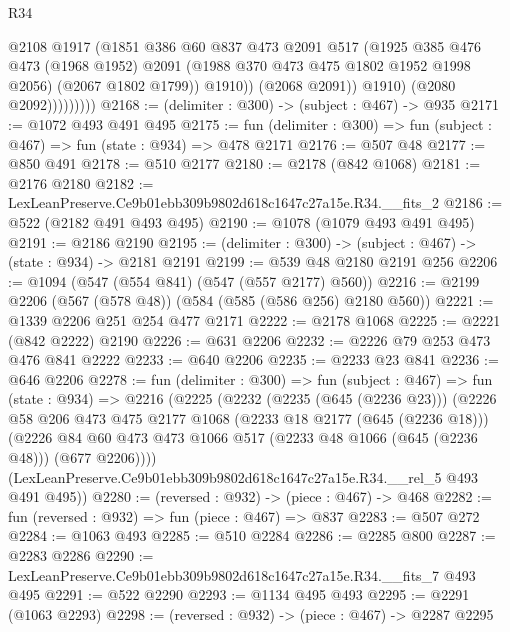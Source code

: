 \begin{lexlean}{R34}
\begin{coremodule}
                          @2108
                          @1917
                          (@1851
                            @386
                            @60
                            @837
                            @473
                            @2091
                            @517
                            (@1925
                              @385
                              @476
                              @473
                              (@1968 @1952)
                              @2091
                              (@1988 @370 @473 @475 @1802 @1952 @1998 @2056)
                              (@2067 @1802 @1799))
                            @1910))
                        (@2068 @2091))
                      @1910)
                    (@2080 @2092)))))))))
@2168 := (delimiter : @300) -> (subject : @467) -> @935
@2171 := @1072 @493 @491 @495
@2175 := fun (delimiter : @300) => fun (subject : @467) => fun (state : @934) => @478 @2171
@2176 := @507 @48
@2177 := @850 @491
@2178 := @510 @2177
@2180 := @2178 (@842 @1068)
@2181 := @2176 @2180
@2182 := LexLeanPreserve.Ce9b01ebb309b9802d618c1647c27a15e.R34.__fits_2
@2186 := @522 (@2182 @491 @493 @495)
@2190 := @1078 (@1079 @493 @491 @495)
@2191 := @2186 @2190
@2195 := (delimiter : @300) -> (subject : @467) -> (state : @934) -> @2181 @2191
@2199 := @539 @48 @2180 @2191 @256
@2206 := @1094 (@547 (@554 @841) (@547 (@557 @2177) @560))
@2216 := @2199 @2206 (@567 (@578 @48)) (@584 (@585 (@586 @256) @2180 @560))
@2221 := @1339 @2206 @251 @254 @477 @2171
@2222 := @2178 @1068
@2225 := @2221 (@842 @2222) @2190
@2226 := @631 @2206
@2232 := @2226 @79 @253 @473 @476 @841 @2222
@2233 := @640 @2206
@2235 := @2233 @23 @841
@2236 := @646 @2206
@2278 := fun (delimiter : @300) =>
  fun (subject : @467) =>
  fun (state : @934) =>
  @2216
    (@2225
      (@2232
        (@2235 (@645 (@2236 @23)))
        (@2226
          @58
          @206
          @473
          @475
          @2177
          @1068
          (@2233 @18 @2177 (@645 (@2236 @18)))
          (@2226 @84 @60 @473 @473 @1066 @517 (@2233 @48 @1066 (@645 (@2236 @48))) (@677 @2206))))
      (LexLeanPreserve.Ce9b01ebb309b9802d618c1647c27a15e.R34.__rel_5 @493 @491 @495))
@2280 := (reversed : @932) -> (piece : @467) -> @468
@2282 := fun (reversed : @932) => fun (piece : @467) => @837
@2283 := @507 @272
@2284 := @1063 @493
@2285 := @510 @2284
@2286 := @2285 @800
@2287 := @2283 @2286
@2290 := LexLeanPreserve.Ce9b01ebb309b9802d618c1647c27a15e.R34.__fits_7 @493 @495
@2291 := @522 @2290
@2293 := @1134 @495 @493
@2295 := @2291 (@1063 @2293)
@2298 := (reversed : @932) -> (piece : @467) -> @2287 @2295

\end{coremodule}
\end{lexlean}
